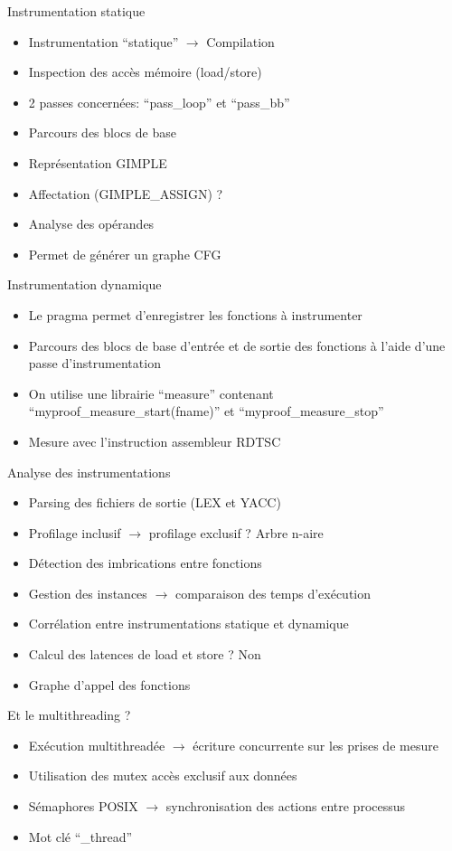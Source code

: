 \documentclass{beamer}
\begin{document}
\begin{frame}{Instrumentation statique}
  \begin{itemize}
  \item Instrumentation ``statique'' $\rightarrow$ Compilation
  \item Inspection des accès mémoire (load/store)
  \item 2 passes concernées: ``pass\_loop'' et ``pass\_bb''
  \item Parcours des blocs de base
  \item Représentation GIMPLE
  \item Affectation (GIMPLE\_ASSIGN) ?
  \item Analyse des opérandes
  \item Permet de générer un graphe CFG
  \end{itemize}
\end{frame}

\begin{frame}{Instrumentation dynamique}
  \begin{itemize}
  \item Le pragma permet d'enregistrer les fonctions à instrumenter
  \item Parcours des blocs de base d'entrée et de sortie des fonctions à l'aide d'une passe d'instrumentation
  \item On utilise une librairie ``measure'' contenant ``myproof\_measure\_start(fname)'' et ``myproof\_measure\_stop''
  \item Mesure avec l'instruction assembleur RDTSC
  \end{itemize}
 \end{frame}

\begin{frame}{Analyse des instrumentations}
  \begin{itemize}
  \item Parsing des fichiers de sortie (LEX et YACC)
  \item Profilage inclusif $\rightarrow$ profilage exclusif ? Arbre n-aire
  \item Détection des imbrications entre fonctions
  \item Gestion des instances $\rightarrow$ comparaison des temps d'exécution
  \item Corrélation entre instrumentations statique et dynamique
  \item Calcul des latences de load et store ? Non
  \item Graphe d'appel des fonctions
  \end{itemize}
\end{frame}

\begin{frame}{Et le multithreading ?}
  \begin{itemize}
  \item Exécution multithreadée $\rightarrow$ écriture concurrente sur les prises de mesure
  \item Utilisation des mutex accès exclusif aux données
  \item Sémaphores POSIX $\rightarrow$ synchronisation des actions entre processus
  \item Mot clé ``\_thread''
  \end{itemize}
\end{frame}
\end{document}
